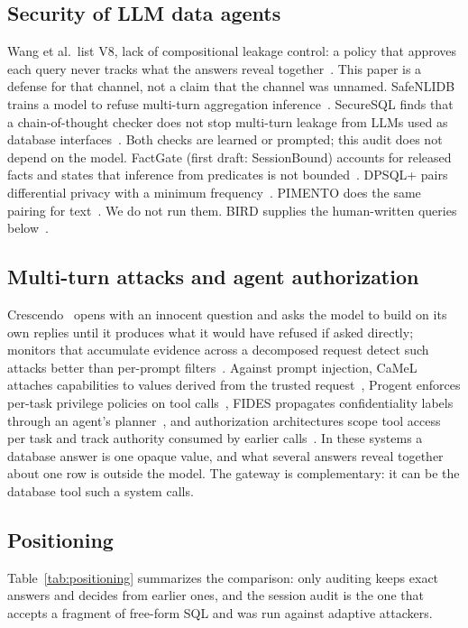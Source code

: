 \documentclass[sigconf,nonacm]{acmart}
\begin{document}
\subsection{Security of LLM data agents}
Wang et al.\ list V8, lack of compositional leakage control: a policy that approves each query never tracks what the answers reveal together~\cite{dataagents2026}. This paper is a defense for that channel, not a claim that the channel was unnamed. SafeNLIDB trains a model to refuse multi-turn aggregation inference~\cite{liu2026safenlidb}. SecureSQL finds that a chain-of-thought checker does not stop multi-turn leakage from LLMs used as database interfaces~\cite{song2024securesql}. Both checks are learned or prompted; this audit does not depend on the model. FactGate (first draft: SessionBound) accounts for released facts and states that inference from predicates is not bounded~\cite{wu2026factgate}. DPSQL+ pairs differential privacy with a minimum frequency~\cite{matsumoto2026dpsql}. PIMENTO does the same pairing for text~\cite{sadia2026pimento}. We do not run them. BIRD supplies the human-written queries below~\cite{li2023bird}.

\subsection{Multi-turn attacks and agent authorization}
Crescendo~\cite{russinovich2025crescendo} opens with an innocent question and asks the model to build on its own replies until it produces what it would have refused if asked directly; monitors that accumulate evidence across a decomposed request detect such attacks better than per-prompt filters~\cite{chen2025sequential}. Against prompt injection, CaMeL attaches capabilities to values derived from the trusted request~\cite{debenedetti2026camel}, Progent enforces per-task privilege policies on tool calls~\cite{shi2025progent}, FIDES propagates confidentiality labels through an agent's planner~\cite{costa2025fides}, and authorization architectures scope tool access per task and track authority consumed by earlier calls~\cite{authz2026agents,agenra2026}. In these systems a database answer is one opaque value, and what several answers reveal together about one row is outside the model. The gateway is complementary: it can be the database tool such a system calls.

\subsection{Positioning}
Table~\ref{tab:positioning} summarizes the comparison: only auditing keeps exact answers and decides from earlier ones, and the session audit is the one that accepts a fragment of free-form SQL and was run against adaptive attackers.
\end{document}

